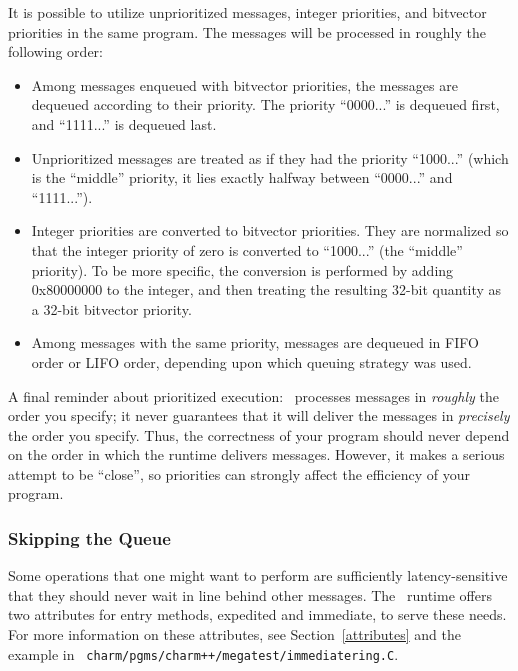 It is possible to utilize unprioritized messages, integer priorities,
and bitvector priorities in the same program.  The messages will be
processed in roughly the following order:

\begin{itemize}

\item Among messages enqueued with bitvector priorities, the
messages are dequeued according to their priority.  The
priority ``0000...'' is dequeued first, and ``1111...'' is
dequeued last.

\item Unprioritized messages are treated as if they had the
priority ``1000...'' (which is the ``middle'' priority, it
lies exactly halfway between ``0000...'' and ``1111...'').

\item Integer priorities are converted to bitvector priorities.  They
are normalized so that the integer priority of zero is converted to
``1000...'' (the ``middle'' priority).  To be more specific, the
conversion is performed by adding 0x80000000 to the integer, and then
treating the resulting 32-bit quantity as a 32-bit bitvector priority.

\item Among messages with the same priority, messages are
dequeued in FIFO order or LIFO order, depending upon which
queuing strategy was used.

\end{itemize}

A final reminder about prioritized execution: \charmpp\ processes
messages in {\it roughly} the order you specify; it never guarantees
that it will deliver the messages in {\it precisely} the
order you specify. Thus, the correctness
of your program should never depend on the order in which the runtime
delivers messages. However, it makes a serious attempt to be
``close'', so priorities can strongly affect the efficiency of your
program.

\subsubsection{Skipping the Queue}

Some operations that one might want to perform are sufficiently
latency-sensitive that they should never wait in line behind other
messages. The \charmpp\ runtime offers two attributes for entry
methods, {\kw expedited} and {\kw immediate}, to serve these
needs. For more information on these attributes, see
Section~\ref{attributes} and the example in {\tt
  charm/pgms/charm++/megatest/immediatering.C}.
